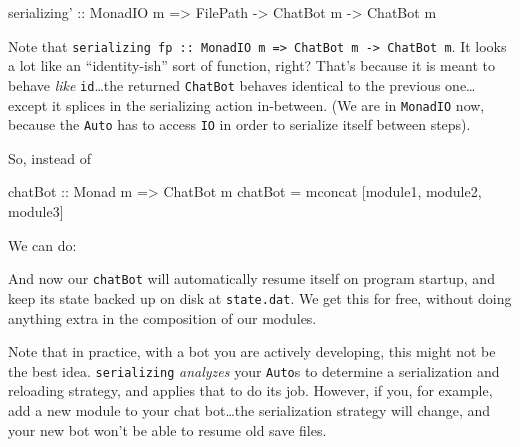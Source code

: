 \documentclass[]{article}
\newenvironment{Shaded}{}{}
\newcommand{\DataTypeTok}[1]{\textcolor[rgb]{0.56,0.13,0.00}{{#1}}}
\newcommand{\StringTok}[1]{\textcolor[rgb]{0.25,0.44,0.63}{{#1}}}
\newcommand{\OtherTok}[1]{\textcolor[rgb]{0.00,0.44,0.13}{{#1}}}
\newcommand{\FunctionTok}[1]{\textcolor[rgb]{0.02,0.16,0.49}{{#1}}}
\newcommand{\NormalTok}[1]{{#1}}
\begin{document}
\begin{Shaded}
\begin{Highlighting}[]
\OtherTok{serializing' ::} \DataTypeTok{MonadIO} \NormalTok{m }\OtherTok{=>} \NormalTok{FilePath }\OtherTok{->} \DataTypeTok{ChatBot} \NormalTok{m }\OtherTok{->} \DataTypeTok{ChatBot} \NormalTok{m}
\end{Highlighting}
\end{Shaded}

Note that
\texttt{serializing\textquotesingle{}\ fp\ ::\ MonadIO\ m\ =\textgreater{}\ ChatBot\ m\ -\textgreater{}\ ChatBot\ m}.
It looks a lot like an ``identity-ish'' sort of function, right? That's
because it is meant to behave \emph{like} \texttt{id}\ldots{}the
returned \texttt{ChatBot} behaves identical to the previous
one\ldots{}except it splices in the serializing action in-between. (We
are in \texttt{MonadIO} now, because the \texttt{Auto} has to access
\texttt{IO} in order to serialize itself between steps).

So, instead of

\begin{Shaded}
\begin{Highlighting}[]
\OtherTok{chatBot ::} \DataTypeTok{Monad} \NormalTok{m }\OtherTok{=>} \DataTypeTok{ChatBot} \NormalTok{m}
\NormalTok{chatBot }\FunctionTok{=} \NormalTok{mconcat [module1, module2, module3]}
\end{Highlighting}
\end{Shaded}

We can do:

\begin{Shaded}
\end{Shaded}

And now our \texttt{chatBot} will automatically resume itself on program
startup, and keep its state backed up on disk at \texttt{state.dat}. We
get this for free, without doing anything extra in the composition of
our modules.

Note that in practice, with a bot you are actively developing, this
might not be the best idea. \texttt{serializing\textquotesingle{}}
\emph{analyzes} your \texttt{Auto}s to determine a serialization and
reloading strategy, and applies that to do its job. However, if you, for
example, add a new module to your chat bot\ldots{}the serialization
strategy will change, and your new bot won't be able to resume old save
files.
\end{document}
